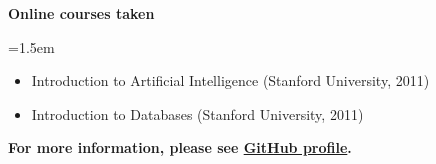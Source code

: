 \documentclass{article}
\def\emcolor{blue!25!black}
\newcommand{\fgem}{\color{\emcolor}}%
\newcommand{\additionalentry}[2]{%
	\noindent \textbf{#1} \par
	\noindent \hangindent=1.5em \hangafter=0 \small #2 \par
	\normalsize
	\vspace{.8em}
}
\newenvironment{main}{%
\noindent
\begin{minipage}[t]{\dimexpr0.75\textwidth-1.5em\relax}%
\let\oldsection\section
\renewcommand{\section}[1]{\oldsection*{\uppercase{\fgem ##1}}\vspace{-0.5em}\hrule\vspace{1em}}
}{%
\let\section\oldsection
\end{minipage}%
}
\begin{document}
\begin{main}
\additionalentry{Online courses taken}{\begin{itemize} \itemsep0em \parsep0em \parskip0em
\vspace{-0.5em}%
\item{Introduction to Artificial Intelligence (Stanford University, 2011)}
\item{Introduction to Databases (Stanford University, 2011)}
\vspace{-0.5em}%
\end{itemize}}

\textbf{For more information, please see \href{https://github.com/ranisalt}{GitHub profile}.}


\end{main}%
\end{document}
